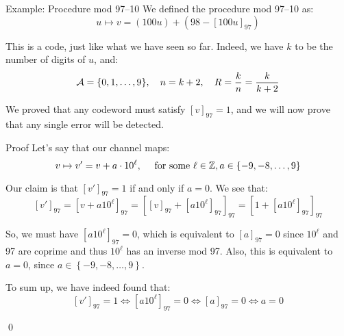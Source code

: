 \documentclass[a4paper]{article}
\begin{document}
\begin{parag}{Example: Procedure mod 97--10}
    We defined the procedure mod 97--10 as: 
    \[u \mapsto v = \left(100u\right) + \left(98 - \left[100u\right]_{97}\right)\]

    This is a code, just like what we have seen so far. Indeed, we have $k$ to be the number of digits of $u$, and: 
    \[\mathcal{A} = \left\{0, 1, \ldots, 9\right\}, \mathspace n = k+2, \mathspace R = \frac{k}{n} = \frac{k}{k + 2}\]
    
    We proved that any codeword must satisfy $\left[v\right]_{97} = 1$, and we will now prove that any single error will be detected.

    \begin{subparag}{Proof}
        Let's say that our channel maps: 
        \[v \mapsto v' = v + a\cdot 10^\ell, \mathspace \text{ for some } \ell \in \mathbb{Z}, a \in \left\{-9, -8, \ldots, 9\right\}\]
        
        Our claim is that $\left[v'\right]_{97} = 1$ if and only if $a = 0$. We see that: 
        \[\left[v'\right]_{97} = \left[v + a 10^\ell\right]_{97} = \left[\left[v\right]_{97} + \left[a 10^{\ell }\right]_{97}\right]_{97} = \left[1 + \left[a 10^\ell\right]_{97}\right]_{97}\]
        
        So, we must have $\left[a 10^\ell \right]_{97} = 0$, which is equivalent to $\left[a\right]_{97} = 0$ since $10^\ell$ and 97 are coprime and thus $10^\ell $ has an inverse mod 97. Also, this is equivalent to $a = 0$, since $a \in \left\{-9, -8, \ldots, 9\right\}$.

        To sum up, we have indeed found that: 
        \[\left[v'\right]_{97} = 1 \iff \left[a 10^\ell \right]_{97} = 0 \iff \left[a\right]_{97} = 0 \iff a = 0\]
        
        \qed
    \end{subparag}
    
\end{parag}
\end{document}

